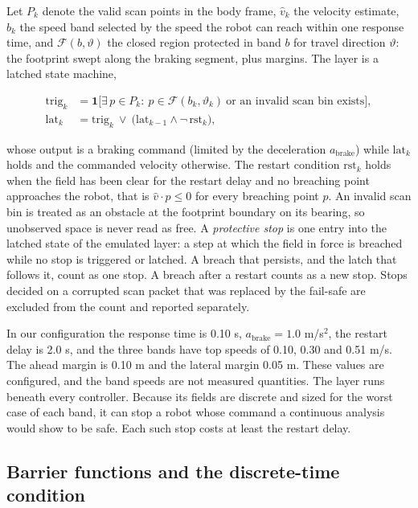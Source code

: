 Let $P_k$ denote the valid scan points in the body frame, $\hat v_k$ the velocity estimate, $b_k$ the speed band selected by the speed the robot can reach within one response time, and $\mathcal{F}(b, \vartheta)$ the closed region protected in band $b$ for travel direction $\vartheta$: the footprint swept along the braking segment, plus margins. The layer is a latched state machine,

\begin{equation*}
\begin{aligned}
\mathrm{trig}_k &= \mathbf{1}\big[\exists\, p \in P_k:\ p \in \mathcal{F}(b_k, \vartheta_k)\ \text{or an invalid scan bin exists}\big],\\
\mathrm{lat}_k &= \mathrm{trig}_k \ \vee\ \big(\mathrm{lat}_{k-1} \wedge \neg\,\mathrm{rst}_k\big),
\end{aligned}
\tag{1}
\end{equation*}

whose output is a braking command (limited by the deceleration $a_{\mathrm{brake}}$) while $\mathrm{lat}_k$ holds and the commanded velocity otherwise. The restart condition $\mathrm{rst}_k$ holds when the field has been clear for the restart delay and no breaching point approaches the robot, that is $\hat v \cdot p \le 0$ for every breaching point $p$. An invalid scan bin is treated as an obstacle at the footprint boundary on its bearing, so unobserved space is never read as free. A \emph{protective stop} is one entry into the latched state of the emulated layer: a step at which the field in force is breached while no stop is triggered or latched. A breach that persists, and the latch that follows it, count as one stop. A breach after a restart counts as a new stop. Stops decided on a corrupted scan packet that was replaced by the fail-safe are excluded from the count and reported separately.

In our configuration the response time is 0.10 s, $a_{\mathrm{brake}} = 1.0$ m/s$^2$, the restart delay is 2.0 s, and the three bands have top speeds of 0.10, 0.30 and 0.51 m/s. The ahead margin is 0.10 m and the lateral margin 0.05 m. These values are configured, and the band speeds are not measured quantities. The layer runs beneath every controller. Because its fields are discrete and sized for the worst case of each band, it can stop a robot whose command a continuous analysis would show to be safe. Each such stop costs at least the restart delay.

\subsection{Barrier functions and the discrete-time condition}


